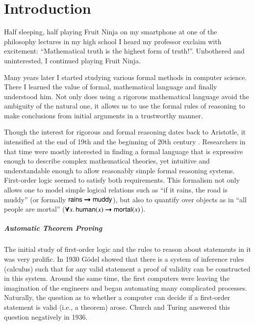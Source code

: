 \chapter{Introduction}
\label{ch:intro}

Half sleeping, half playing Fruit Ninja on my smartphone at one of the
philosophy lectures in my high school I heard my professor exclaim with
excitement: “Mathematical truth is the highest form of truth!”.
Unbothered and uninterested, I continued playing Fruit Ninja.

Many years later I started studying various formal methods in computer science.
There I learned the value of formal, mathematical language and finally
understood him. Not only does using a rigorous mathematical language avoid the
ambiguity of the natural one, it allows us to use the formal rules of reasoning
to make conclusions from initial arguments in a trustworthy manner. 

Though the interest for rigorous and formal reasoning dates back to Aristotle,
it intensified at the end of 19th and the beginning of 20th century
\cite{jf-01-modern-logic}. Researchers in that time were mostly interested in
finding a formal language that is expressive enough to describe complex
mathematical theories, yet intuitive and understandable enough to allow
reasonably simple formal reasoning systems. First-order logic seemed to satisfy
both requirements.  This formalism not only allows one to model simple
logical relations such as ``if it rains, the road is muddy'' (or formally
$\mathsf{rains} \pmb{\rightarrow} \mathsf{muddy}$), but also to quantify over objects as in ``all
people are mortal'' ($\pmb{\forall} x.\, \mathsf{human}(x) \pmb{\rightarrow} \mathsf{mortal}(x)$).

\paragraph{Automatic Theorem Proving}The initial study of first-order logic and the rules to reason about statements in
it was very prolific. In 1930 G\"odel \cite{kg-30-completeness-theorem} showed
that there is a system of inference rules (calculus) such that for any valid
statement a proof of validity can be constructed in this system. Around the same
time, the first computers were leaving the imagination of the engineers and
began automating many complicated processes.  Naturally, the question as to
whether a computer can decide if a first-order statement is valid (i.e., a
theorem) arose. Church \cite{ac-36-fol-undecidable} and Turing
\cite{tm-37-undecidable} answered this question negatively in 1936.

